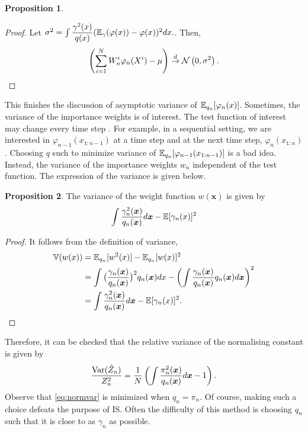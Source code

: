\documentclass[10pt]{article}
\theoremstyle{definition}
\newtheorem{proposition}{Proposition}
\numberwithin{equation}{section}
\begin{document}
\begin{proposition}
\begin{proof}
	Let $\sigma^2 = \int \dfrac{\gamma^2(x)}{q(x)}(\mathbb{E}_\gamma(\varphi(x)) - \varphi(x))^2dx.$. Then,
	\begin{equation}
	\left(  \sum_{i=1}^{N} W_n^i \varphi_n(X^i) - \mu \right) \overset{d}{\to} \mathcal{N} \left( 0, \sigma^2 \right).
	\end{equation}
	\end{proof}

\end{proposition}

This finishes the discussion of asymptotic variance of $\mathbb{E}_{q_n}[\varphi_n(x)]$. Sometimes, the variance of the importance weights is of interest. The test function of interest may change every time step \cite{doucet2008}. For example, in a sequential setting, we are interested in $\varphi_{n-1}(x_{1:n-1})$ at a time step and at the next time step, $\varphi_n(x_{1:n})$. Choosing $q$ such to minimize variance of $\mathbb{E}_{q_n}[\varphi_{n-1}(x_{1:n-1})]$ is a bad idea. Instead, the variance of the importance weights $w_n$ independent of the test function. The expression of the variance is given below.

\begin{proposition}
	The variance of the weight function $w(\bm{x})$ is given by 
	\begin{equation} \label{eq:var_is}
	\int \dfrac{\gamma_n^2(\bm{x})}{q_n(\bm{x})} d\bm{x} - \mathbb{E}[\gamma_n(x)]^2
	\end{equation}
	
	\begin{proof}
		It follows from the definition of variance,
		\begin{align}
		\mathbb{V}(w(x)) &= \mathbb{E}_{q_n}[w^2(x)] - \mathbb{E}_{q_n}[w(x)]^2 \\
		&= \int \big(\dfrac{\gamma_n(\bm{x})}{q_n(\bm{x})}\big)^2 q_n(\bm{x}) dx - \left( \int \dfrac{\gamma_n(\bm{x})}{q_n(\bm{x})} q_n(\bm{x}) d\bm{x} \right)^2 \\
		&= \int \dfrac{\gamma_n^2(\bm{x})}{q_n(\bm{x})} d\bm{x} - \mathbb{E}[\gamma_n(x)]^2.
		\end{align}
	\end{proof}
\end{proposition} Therefore, it can be checked that the relative variance of the normalising constant is given by 
\begin{equation} \label{eq:normvar}
\dfrac{\text{Var}(\hat{Z}_n)}{Z_n^2} = \dfrac{1}{N}\left(\int \dfrac{\pi_n^2(\bm{x})}{q_n(\bm{x})} d\bm{x} - 1 \right).
\end{equation}
Observe that \eqref{eq:normvar} is minimized when $q_n = \pi_n$. Of course, making such a choice defeats the purpose of IS. Often the difficulty of this method is choosing $q_n$ such that it is close to as $\gamma_n$ as possible. 
\end{document}
